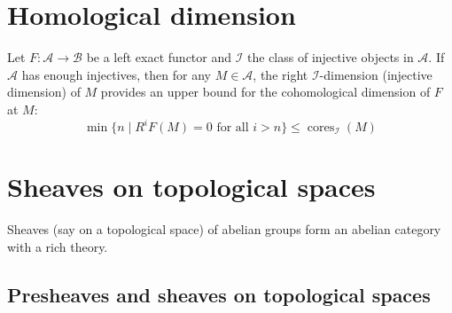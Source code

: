 \section{Homological dimension}









\begin{proposition}
Let $F: \mathcal{A} \to \mathcal{B}$ be a left exact functor and $\mathcal{I}$ the class of injective objects in $\mathcal{A}$. If $\mathcal{A}$ has enough injectives, then for any $M \in \mathcal{A}$, the right $\mathcal{I}$-dimension (injective dimension) of $M$ provides an upper bound for the cohomological dimension of $F$ at $M$:
$$ \min \{ n \mid R^iF(M) = 0 \text{ for all } i > n \} \leq \operatorname{cores}_{\mathcal{I}}(M) $$
\end{proposition}














\section{Sheaves on topological spaces}

Sheaves (say on a topological space) of abelian groups form an abelian category with a rich theory.


\subsection{Presheaves and sheaves on topological spaces}






